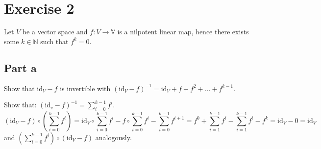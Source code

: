 \documentclass[a4paper]{article}
\theoremstyle{definition}
\begin{document}
\section{Exercise 2}
%
\begin{ex}
  Let $V$ be a vector space and $f: V \to \mathbb V$ is a nilpotent linear map,
  hence there exists some $k \in \mathbb N$ such that $f^k = 0$.
\end{ex}

\subsection{Part a}
\begin{ex}
  Show that $\text{id}_V - f$ is invertible with $(\text{id}_V - f)^{-1} = \text{id}_V + f + f^2 + \ldots + f^{k-1}$.
\end{ex}

Show that: $(\text{id}_v - f)^{-1} = \sum_{i=0}^{k-1} f^i$.
\[ (\text{id}_V - f) \circ \left(\sum_{i=0}^{k-1} f^{i}\right) = \text{id}_V \circ \sum_{i=0}^{k-1} f^i - f \circ \sum_{i=0}^{k-1} f^i - \sum_{i=0}^{k-1} f^{i+1} = f^0 + \sum_{i=1}^{k-1} f^i - \sum_{i=1}^{k-1} f^i - f^k = \text{id}_V - 0 = \text{id}_V \]
and $\left(\sum_{i=0}^{k-1} f^i\right) \circ \left(\text{id}_V - f\right)$ analogously.
\end{document}
